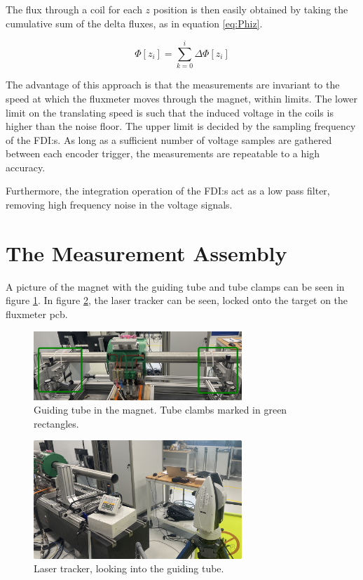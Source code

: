 The flux through a coil for each $z$ position is then easily obtained
by taking the cumulative sum of the delta fluxes, as in equation
\ref{eq:Phiz}.

\begin{equation}
    \Phi[z_i] = \sum \limits_{k=0}^i \Delta \Phi[z_i]
    \label{eq:Phiz}
\end{equation}

The advantage of this approach is that the measurements are invariant
to the speed at which the fluxmeter moves through the magnet, within limits.
The lower limit on the translating speed is such that the induced
voltage in the coils is higher than the noise floor.
The upper limit is decided by the sampling frequency of the FDI:s.
As long as a sufficient number of voltage samples are gathered between
each encoder trigger, the measurements are repeatable to a high accuracy.

Furthermore, the integration operation of the FDI:s act as a
low pass filter, removing high frequency noise in the voltage
signals.

\section{The Measurement Assembly}
A picture of the magnet with the guiding tube and tube clamps can be seen in
figure \ref{fig:magnetassembly}. In figure \ref{fig:leica}, the laser tracker
can be seen, locked onto the target on the fluxmeter pcb.

\begin{figure}[h]
    \centering
    \includegraphics[width=0.7\textwidth]{figs/magnet-assembly}
    \caption{Guiding tube in the magnet. Tube clambs marked in green rectangles.}
    \label{fig:magnetassembly}
\end{figure}

\begin{figure}[h]
    \centering
    \includegraphics[width=0.7\textwidth]{figs/leica}
    \caption{Laser tracker, looking into the guiding tube.}
    \label{fig:leica}
\end{figure}

